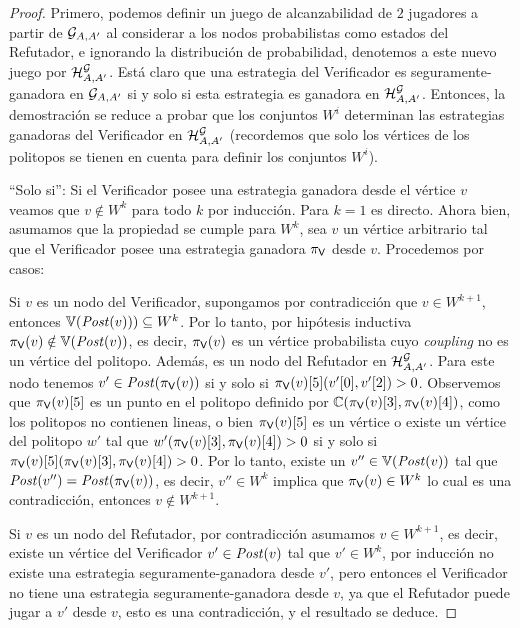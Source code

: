 \begin{proof} Primero, podemos definir un juego de alcanzabilidad de $2$ jugadores a partir de  $\StochG_{A,A'}$ al considerar a los nodos probabilistas como estados del Refutador, e ignorando la distribución de probabilidad, denotemos a este nuevo juego por $\mathcal{H}^\StochG_{A,A'}$. 
Está claro que una estrategia del Verificador es seguramente-ganadora en $\StochG_{A,A'}$ si y solo si esta estrategia es ganadora en $\mathcal{H}^\StochG_{A,A'}$. 
Entonces, la demostración se reduce a probar que los conjuntos $W^i$ determinan las estrategias ganadoras del Verificador en $\mathcal{H}^\StochG_{A, A'}$ (recordemos que solo los vértices de los politopos se tienen en cuenta para definir los conjuntos $W^i$). 

``Solo si'': Si el Verificador posee una estrategia ganadora desde el vértice $v$ veamos que $v \notin W^k$ para todo $k$ por inducción. 
Para $k=1$ es directo. Ahora bien, asumamos que la propiedad se cumple para $W^k$, sea $v$ un vértice arbitrario tal que el Verificador posee una estrategia ganadora $\strat{\Verifier}$ desde $v$.  Procedemos por casos:

Si $v$ es un nodo del Verificador, supongamos por contradicción que $v \in W^{k+1}$, entonces $\vertices{\post(v))}  \subseteq W^k$. 
Por lo tanto, por hipótesis inductiva $\strat{\Verifier}(v) \notin \vertices{\post(v)}$, es decir, $\strat{\Verifier}(v)$ es un vértice probabilista cuyo \textit{coupling} no es un vértice del politopo. Además, es un nodo del Refutador en $\mathcal{H}^\StochG_{A,A'}$. Para este nodo tenemos $v' \in \post(\strat{\Verifier}(v))$ si y solo si $\pr{5}{\strat{\Verifier}(v)}(\pr{0}{v'}, \pr{2}{v'})>0$. 
Observemos que $\pr{5}{\strat{\Verifier}(v)}$ es un punto en el politopo definido por $\couplings{\pr{3}{\strat{\Verifier}(v)}}{\pr{4}{\strat{\Verifier}(v)}}$, 
como los politopos no contienen lineas, o bien $\pr{5}{\strat{\Verifier}(v)}$ es un vértice o existe un vértice del politopo $w'$ tal que   $w'(\pr{3}{\strat{\Verifier}(v)}, \pr{4}{\strat{\Verifier}(v)})>0$ si y solo si $\pr{5}{\strat{\Verifier}(v)}(\pr{3}{\strat{\Verifier}(v)}, \pr{4}{\strat{\Verifier}(v)})>0$. 
Por lo tanto, existe un $v'' \in \vertices{\post(v)}$ tal que $\post(v'') = \post(\strat{\Verifier}(v))$, es decir, $v'' \in W^k$ implica que $\strat{\Verifier}(v) \in W^{k}$ lo cual es una contradicción, entonces $v \notin W^{k+1}$. 

Si $v$ es un nodo del Refutador, por contradicción asumamos $v \in W^{k+1}$, es decir, existe un vértice del Verificador $v' \in \post(v)$ tal que 
$v' \in W^k$, por inducción no existe una estrategia seguramente-ganadora desde $v'$, pero entonces el Verificador no tiene una estrategia seguramente-ganadora desde $v$, ya que
el Refutador puede jugar a $v'$ desde $v$, esto es una contradicción, y el resultado se deduce.


\end{proof}
